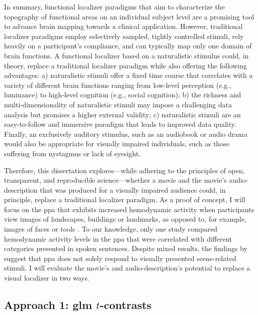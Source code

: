In summary, functional localizer paradigms that aim to characterize the
topography of functional areas on an individual subject level are a promising
tool to advance brain mapping towards a clinical application.
However, traditional localizer paradigms employ selectively sampled, tightly
controlled stimuli, rely heavily on a participant's compliance, and can
typically map only one domain of brain functions.
A functional localizer based on a naturalistic stimulus could, in theory,
replace a traditional localizer paradigm while also offering the following
advantages:
a) naturalistic stimuli offer a fixed time course that correlates with a variety
of different brain functions ranging from low-level perception (e.g., luminance)
to high-level cognition (e.g., social cognition);
b) the richness and multi-dimensionality of naturalistic stimuli may impose a
challenging data analysis but promises a higher external validity;
c) naturalistic stimuli are an easy-to-follow and immersive paradigm that leads
to improved data quality.
Finally, an exclusively auditory stimulus, such as an audiobook or audio drama
would also be appropriate for visually impaired individuals, such as those
suffering from nystagmus or lack of eyesight.

Therefore, this dissertation explores---while adhering to the principles of
open, transparent, and reproducible science---whether a movie and the movie's
audio-description that was produced for a visually impaired audience could, in
principle, replace a traditional localizer paradigm.
As a proof of concept, I will focus on the \ac{ppa} that exhibits increased
hemodynamic activity when participants view images of landscapes, buildings or
landmarks, as opposed to, for example, images of faces or tools
\citep[e.g.,][for reviews]{epstein2014neural, aminoff2013role}.
To our knowledge, only one study \citep[cf.][]{aziz2008modulation} compared
hemodynamic activity levels in the \ac{ppa} that were correlated with different
categories presented in spoken sentences.
%
Despite mixed results, the findings by \citet{aziz2008modulation} suggest that
\ac{ppa} does not solely respond to visually presented scene-related stimuli.
%
I will evaluate the movie's and audio-description's potential to replace a
visual localizer in two ways.


\subsection{Approach 1: \ac{glm} $t$-contrasts}

